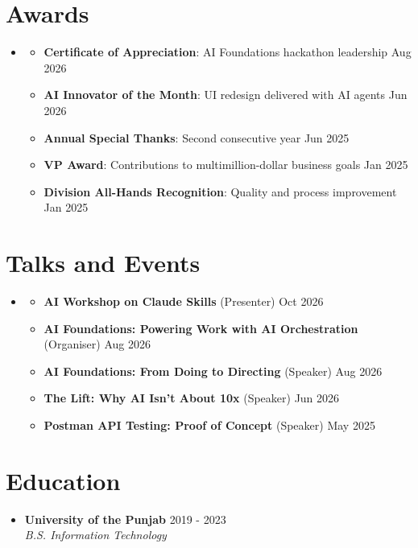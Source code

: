 \documentclass[letterpaper,11pt]{article}
\newcommand{\resumeItem}[1]{\item\small{#1 \vspace{-3.5pt}}}
\newcommand{\resumeSubheading}[4]{%
  \vspace{-2pt}\item \textbf{#1} \hfill #2 \\
  \textit{\small #3} \hfill \textit{\small #4} \vspace{-6pt}}
\newcommand{\resumeSubHeadingListStart}{\begin{itemize}[leftmargin=0.15in, label={}]}
\newcommand{\resumeSubHeadingListEnd}{\end{itemize}}
\newcommand{\resumeItemListStart}{\begin{itemize}[topsep=3pt]}
\newcommand{\resumeItemListEnd}{\end{itemize}\vspace{-4pt}}
\begin{document}
\section{Awards}
  \resumeSubHeadingListStart
    \item
    \resumeItemListStart
      \resumeItem{\textbf{Certificate of Appreciation}: AI Foundations hackathon leadership \hfill Aug 2026}
      \resumeItem{\textbf{AI Innovator of the Month}: UI redesign delivered with AI agents \hfill Jun 2026}
      \resumeItem{\textbf{Annual Special Thanks}: Second consecutive year \hfill Jun 2025}
      \resumeItem{\textbf{VP Award}: Contributions to multimillion-dollar business goals \hfill Jan 2025}
      \resumeItem{\textbf{Division All-Hands Recognition}: Quality and process improvement \hfill Jan 2025}
    \resumeItemListEnd
  \resumeSubHeadingListEnd

\section{Talks and Events}
  \resumeSubHeadingListStart
    \item
    \resumeItemListStart
      \resumeItem{\textbf{AI Workshop on Claude Skills} (Presenter) \hfill Oct 2026}
      \resumeItem{\textbf{AI Foundations: Powering Work with AI Orchestration} (Organiser) \hfill Aug 2026}
      \resumeItem{\textbf{AI Foundations: From Doing to Directing} (Speaker) \hfill Aug 2026}
      \resumeItem{\textbf{The Lift: Why AI Isn't About 10x} (Speaker) \hfill Jun 2026}
      \resumeItem{\textbf{Postman API Testing: Proof of Concept} (Speaker) \hfill May 2025}
    \resumeItemListEnd
  \resumeSubHeadingListEnd

\section{Education}
  \resumeSubHeadingListStart
    \resumeSubheading
      {University of the Punjab}{2019 - 2023}
      {B.S. Information Technology}{}
  \resumeSubHeadingListEnd
\end{document}
